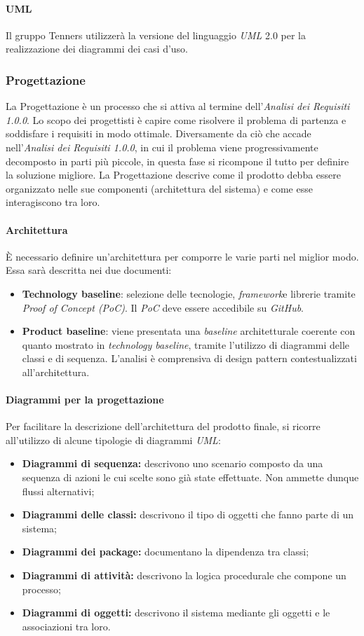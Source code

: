 \paragraph{UML\glo}
Il gruppo Tenners utilizzerà la versione del linguaggio \textit{UML\glo} 2.0 per la realizzazione dei diagrammi dei casi d'uso.
\subsubsection{Progettazione}
La Progettazione è un processo che si attiva al termine dell'\textit{Analisi dei Requisiti 1.0.0\docs}. Lo scopo dei progettisti è capire come risolvere il problema di partenza e soddisfare i requisiti in modo ottimale. Diversamente da ciò che accade nell'\textit{Analisi dei Requisiti 1.0.0\docs}, in cui il problema viene progressivamente decomposto in parti più piccole, in questa fase si ricompone il tutto per definire la soluzione migliore. La Progettazione descrive come il prodotto debba essere organizzato nelle sue componenti (architettura del sistema) e come esse interagiscono tra loro.
\paragraph{Architettura}
È necessario definire un'architettura per comporre le varie parti nel miglior modo. Essa sarà descritta nei due documenti:%
\begin{itemize}
  \item \textbf{Technology baseline\glos}: selezione delle tecnologie, \textit{framework}\glo e librerie tramite \textit{Proof of Concept (PoC)\glos}. Il \textit{PoC\glo} deve essere accedibile su \textit{GitHub\glos}.
  \item \textbf{Product baseline}: viene presentata una \textit{baseline\glos} architetturale coerente con quanto mostrato in \textit{technology baseline\glos}, tramite l'utilizzo di diagrammi delle classi e di sequenza. L'analisi è comprensiva di design pattern contestualizzati all'architettura.
\end{itemize}
\paragraph{Diagrammi per la progettazione}
Per facilitare la descrizione dell'architettura del prodotto finale, si ricorre all'utilizzo di alcune tipologie di diagrammi \textit{UML\glos}:
\begin{itemize}
	\item \textbf{Diagrammi di sequenza:} descrivono uno scenario composto da una sequenza di azioni le cui scelte sono già state effettuate. Non ammette dunque flussi alternativi;
	\item \textbf{Diagrammi delle classi:} descrivono il tipo di oggetti che fanno parte di un sistema;
	\item \textbf{Diagrammi dei package:} documentano la dipendenza tra classi;
	\item \textbf{Diagrammi di attività:} descrivono la logica procedurale che compone un processo;
	\item \textbf{Diagrammi di oggetti:} descrivono il sistema mediante gli oggetti e le associazioni tra loro.
\end{itemize}
